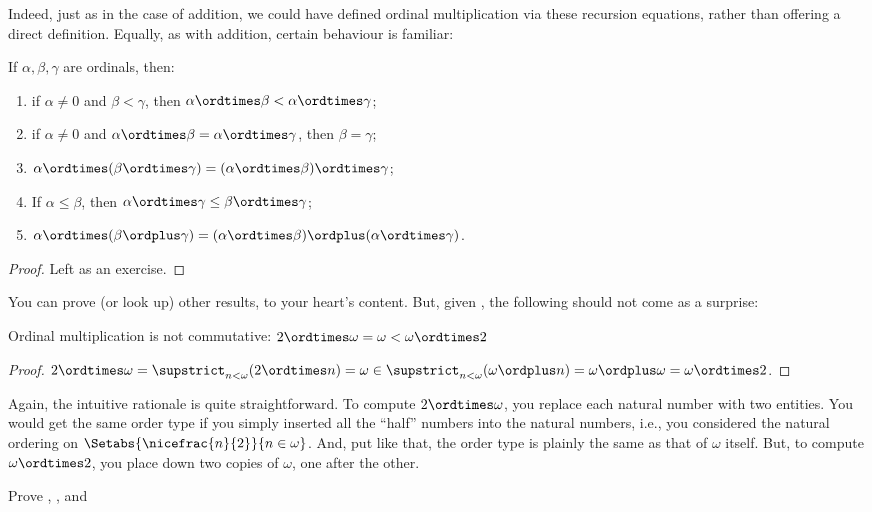 \documentclass[../../../include/open-logic-section]{subfiles}
\begin{document}
Indeed, just as in the case of addition, we could have defined ordinal
multiplication via these recursion equations, rather than offering a
direct definition. Equally, as with addition, certain behaviour is
familiar:

\begin{lem}
If $\alpha, \beta, \gamma$ are ordinals, then:
\begin{enumerate}
	\item{} if $\alpha \neq 0$ and $\beta < \gamma$,
	then $\alpha \ordtimes \beta < \alpha \ordtimes \gamma$;
	\item{} if $\alpha \neq 0$ and $\alpha \ordtimes
	\beta = \alpha\ordtimes\gamma$, then $\beta = \gamma$;
	\item{}  $\alpha \ordtimes (\beta \ordtimes
	\gamma) = (\alpha \ordtimes \beta) \ordtimes \gamma$;
	\item{}  If $\alpha \leq \beta$, then $\alpha
	\ordtimes \gamma \leq \beta \ordtimes \gamma$;
	\item{}  $\alpha \ordtimes (\beta \ordplus
	\gamma) = (\alpha \ordtimes \beta )\ordplus (\alpha\ordtimes
	\gamma)$.
\end{enumerate}
\end{lem}

\begin{proof}
Left as an exercise.
\end{proof}

You can prove (or look up) other results, to your heart's content.
But, given
, the
following should not come as a surprise:

\begin{prop}
Ordinal multiplication is not commutative: $2 \ordtimes \omega  =
\omega < \omega \ordtimes 2$
\end{prop}

\begin{proof}
$2 \ordtimes \omega = \supstrict_{n < \omega}(2\ordtimes  n) = \omega \in \supstrict_{n < \omega}(\omega \ordplus n) = \omega \ordplus \omega = \omega \ordtimes 2$.
\end{proof}

Again, the intuitive rationale is quite straightforward. To compute $2
\ordtimes \omega$, you replace each natural number with two entities.
You would get the same order type if you simply inserted all the
``half'' numbers into the natural numbers, i.e., you considered the
natural ordering on $\Setabs{\nicefrac{n}{2}}{n \in \omega}$. And, put
like that, the order type is plainly the same as that of $\omega$
itself. But, to compute $\omega \ordtimes 2$, you place down two
copies of $\omega$, one after the other. 

\begin{prob}
Prove
,
,
and
\end{prob}
\end{document}
